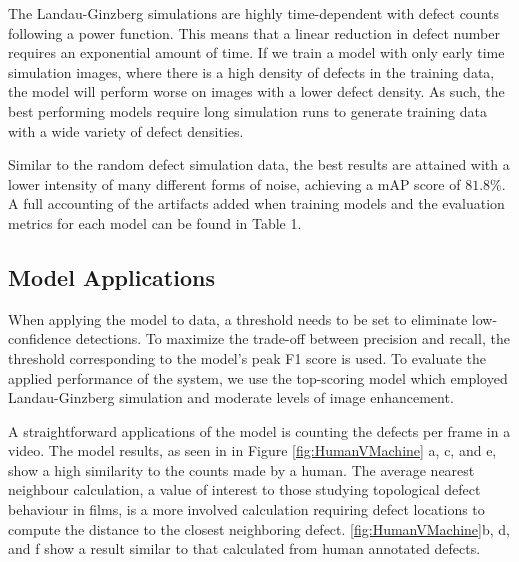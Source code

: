 \documentclass[prl,reprint,showpacs,floatfix,nofootinbib]{revtex4-1}
\begin{document}
The Landau-Ginzberg simulations are highly time-dependent with defect counts following a power function. This means that a linear reduction in defect number requires an exponential amount of time. If we train a model with only early time simulation images, where there is a high density of defects in the training data, the model will perform worse on images with a lower defect density. As such, the best performing models require long simulation runs to generate training data with a wide variety of defect densities. 

Similar to the random defect simulation data, the best results are attained with a lower intensity of many different forms of noise, achieving a mAP score of $81.8\%$. A full accounting of the artifacts added when training models and the evaluation metrics for each model can be found in Table 1.

\subsection{Model Applications}

When applying the model to data, a threshold needs to be set to eliminate low-confidence detections. To maximize the trade-off between precision and recall, the threshold corresponding to the model's peak F1 score is used. To evaluate the applied performance of the system, we use the top-scoring model which employed Landau-Ginzberg simulation and moderate levels of image enhancement.%

A straightforward applications of the model is counting the defects per frame in a video. The model results, as seen in  in Figure \ref{fig:HumanVMachine} a, c, and e, show a high similarity to the counts made by a human.
The average nearest neighbour calculation, a value of interest to those studying topological defect behaviour in films, is a more involved calculation requiring defect locations to compute the distance to the closest neighboring defect. \ref{fig:HumanVMachine}b, d, and f show a result similar to that calculated from human annotated defects. %
\end{document}
